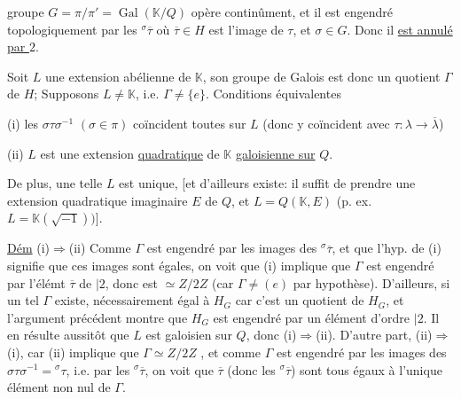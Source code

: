  groupe $G=\pi/\pi'=\operatorname{Gal}(\mathbb K/Q)$ opère continûment, et il est engendré topologiquement par les ${}^{\sigma}\overline\tau$ où $\overline\tau\in H$ est l'image de $\tau$, et $\sigma\in G$. Donc il \uline{est annulé par $2$}.

Soit $L$ une extension abélienne de $\mathbb K$,  son groupe de Galois est donc un quotient $\Gamma$ de $H$;  Supposons $L\ne \mathbb K$, i.e. $\Gamma\ne\{e\}$. Conditions équivalentes

(i) les $\sigma\tau\sigma^{-1}$ $(\sigma\in\pi)$ coïncident toutes sur $L$ (donc y coïncident avec $\tau:\lambda\to\overline\lambda$)

(ii) $L$ est une extension \uline{quadratique} de $\mathbb K$ \uline{galoisienne sur} $Q$.


De plus, une telle $L$  est unique, [et d'ailleurs existe: il suffit de prendre une extension quadratique imaginaire $E$ de $Q$,  et $L=Q(\mathbb K,E)$ (p. ex. $L=\mathbb K(\sqrt{-1}))$].

\uline{Dém} (i)$\Rightarrow$(ii) Comme $\Gamma$ est engendré par les images  des ${}^{\sigma}\overline\tau$,  et que l'hyp. de (i) signifie que ces images sont égales, on voit que (i) implique que $\Gamma$ est engendré par l'élémt $\overline\tau$ de  $|2$, donc est $\simeq Z/2Z$ (car $\Gamma\ne(e)$ par hypothèse). D'ailleurs, si un tel $\Gamma$ existe,   nécessairement égal à $H_G$ car  c'est un quotient de $H_G$, et l'argument précédent montre que  $H_G$ est engendré par un élément d'ordre $|2$.   Il en résulte aussitôt que $L$ est galoisien sur $Q$, donc (i)$\Rightarrow$(ii). D'autre part, (ii)$\Rightarrow$(i), car (ii) implique que $\Gamma\simeq Z/2Z$ , et comme $\Gamma$ est engendré par les images des $\sigma\tau\sigma^{-1}={}^{\sigma}\tau$, i.e. par les ${}^{\sigma}\overline\tau$, on voit que $\overline\tau$ (donc les ${}^{\sigma}\overline\tau$) sont tous égaux à l'unique élément non nul de $\Gamma$.

